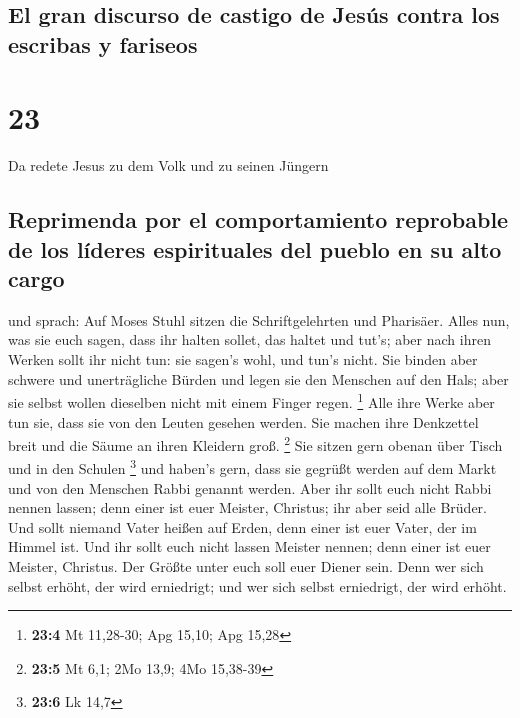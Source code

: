 \hypertarget{el-gran-discurso-de-castigo-de-jesuxfas-contra-los-escribas-y-fariseos}{%
\subsection{El gran discurso de castigo de Jesús contra los escribas y
fariseos}\label{el-gran-discurso-de-castigo-de-jesuxfas-contra-los-escribas-y-fariseos}}

\hypertarget{section-22}{%
\section{23}\label{section-22}}

 Da redete Jesus zu dem Volk und zu seinen Jüngern

\hypertarget{reprimenda-por-el-comportamiento-reprobable-de-los-luxedderes-espirituales-del-pueblo-en-su-alto-cargo}{%
\subsection{Reprimenda por el comportamiento reprobable de los líderes
espirituales del pueblo en su alto
cargo}\label{reprimenda-por-el-comportamiento-reprobable-de-los-luxedderes-espirituales-del-pueblo-en-su-alto-cargo}}

 und sprach: Auf Moses Stuhl sitzen die Schriftgelehrten
und Pharisäer.  Alles nun, was sie euch sagen, dass ihr
halten sollet, das haltet und tut's; aber nach ihren Werken sollt ihr
nicht tun: sie sagen's wohl, und tun's nicht.  Sie binden
aber schwere und unerträgliche Bürden und legen sie den Menschen auf den
Hals; aber sie selbst wollen dieselben nicht mit einem Finger regen.
\footnote{\textbf{23:4} Mt 11,28-30; Apg 15,10; Apg 15,28}
 Alle ihre Werke aber tun sie, dass sie von den Leuten
gesehen werden. Sie machen ihre Denkzettel breit und die Säume an ihren
Kleidern groß. \footnote{\textbf{23:5} Mt 6,1; 2Mo 13,9; 4Mo 15,38-39}
 Sie sitzen gern obenan über Tisch und in den Schulen
\footnote{\textbf{23:6} Lk 14,7}  und haben's gern, dass
sie gegrüßt werden auf dem Markt und von den Menschen Rabbi genannt
werden.  Aber ihr sollt euch nicht Rabbi nennen lassen;
denn einer ist euer Meister, Christus; ihr aber seid alle Brüder.
 Und sollt niemand Vater heißen auf Erden, denn einer ist
euer Vater, der im Himmel ist.  Und ihr sollt euch nicht
lassen Meister nennen; denn einer ist euer Meister, Christus.
 Der Größte unter euch soll euer Diener sein.
 Denn wer sich selbst erhöht, der wird erniedrigt; und
wer sich selbst erniedrigt, der wird erhöht.

